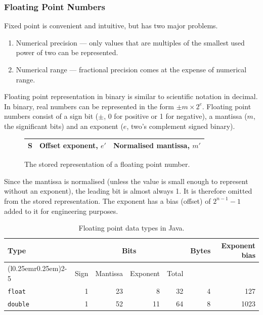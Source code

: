 \subsubsection{Floating Point Numbers}

Fixed point is convenient and intuitive, but has two major problems.
\begin{enumerate}
  \item Numerical precision --- only values that are multiples of the smallest used power of two can be represented.
  \item Numerical range --- fractional precision comes at the expense of numerical range.
\end{enumerate}

Floating point representation in binary is similar to scientific notation in decimal.
In binary, real numbers can be represented in the form \( \pm m \times 2 ^ e \).
Floating point numbers consist of a sign bit (\( \pm \), \num{0} for positive or \num{1} for negative), a mantissa (\( m \), the significant bits) and an exponent (\( e \), two's complement signed binary).

\begin{figure}[htp]
  \centering
  \begin{tabular}{|c|c|c|}
    \hline
    S & Offset exponent, \( e' \) & Normalised mantissa, \( m' \) \\
    \hline
  \end{tabular}
  \caption*{The stored representation of a floating point number.}
\end{figure}

Since the mantissa is normalised (unless the value is small enough to represent without an exponent), the leading bit is almost always \num{1}.
It is therefore omitted from the stored representation.
The exponent has a bias (offset) of \( 2^{n-1} - 1 \) added to it for engineering purposes.

\begin{table}[htp]
  \centering
  \caption*{Floating point data types in Java.}
  \begin{tabular}{lrrrrrr}
    \toprule
    Type & \multicolumn{4}{c}{Bits} & Bytes & Exponent bias \\
    \cmidrule(l{0.25em}r{0.25em}){2-5}
    & Sign & Mantissa & Exponent & Total & & \\
    \midrule
    \texttt{float}  & 1 & 23 &  8 & 32 & 4 &  127 \\
    \texttt{double} & 1 & 52 & 11 & 64 & 8 & 1023 \\
    \bottomrule
  \end{tabular}
\end{table}

